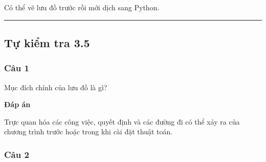 \documentclass[
  11pt,
  a4paper,
]{article}
\newenvironment{Shaded}{}{}
\newcommand{\BuiltInTok}[1]{\textcolor[rgb]{0.00,0.50,0.00}{#1}}
\newcommand{\ControlFlowTok}[1]{\textcolor[rgb]{0.00,0.44,0.13}{\textbf{#1}}}
\newcommand{\FloatTok}[1]{\textcolor[rgb]{0.25,0.63,0.44}{#1}}
\newcommand{\KeywordTok}[1]{\textcolor[rgb]{0.00,0.44,0.13}{\textbf{#1}}}
\newcommand{\NormalTok}[1]{#1}
\newcommand{\OperatorTok}[1]{\textcolor[rgb]{0.40,0.40,0.40}{#1}}
\newcommand{\SpecialCharTok}[1]{\textcolor[rgb]{0.25,0.44,0.63}{#1}}
\newcommand{\StringTok}[1]{\textcolor[rgb]{0.25,0.44,0.63}{#1}}
\begin{document}
\begin{Shaded}
\end{Shaded}

Có thể vẽ lưu đồ trước rồi mới dịch sang Python.

\begin{center}\rule{0.5\linewidth}{0.5pt}\end{center}

\subsection{Tự kiểm tra 3.5}\label{tux1ef1-kiux1ec3m-tra-3.5}

\subsubsection{Câu 1}\label{cuxe2u-1-4}

Mục đích chính của lưu đồ là gì?

\textbf{Đáp án}

Trực quan hóa các công việc, quyết định và các đường đi có thể xảy ra
của chương trình trước hoặc trong khi cài đặt thuật toán.

\subsubsection{Câu 2}\label{cuxe2u-2-4}
\end{document}
